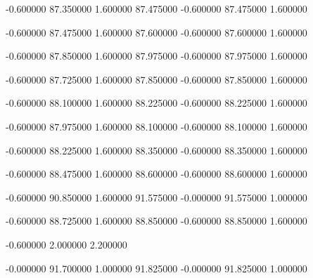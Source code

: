 {-0.600000} {87.350000} {1.600000} {87.475000} {-0.600000} {87.475000} {1.600000}

 {-0.600000} {87.475000} {1.600000} {87.600000} {-0.600000} {87.600000} {1.600000}

 {-0.600000} {87.850000} {1.600000} {87.975000} {-0.600000} {87.975000} {1.600000}

 {-0.600000} {87.725000} {1.600000} {87.850000} {-0.600000} {87.850000} {1.600000}

 {-0.600000} {88.100000} {1.600000} {88.225000} {-0.600000} {88.225000} {1.600000}

 {-0.600000} {87.975000} {1.600000} {88.100000} {-0.600000} {88.100000} {1.600000}

 {-0.600000} {88.225000} {1.600000} {88.350000} {-0.600000} {88.350000} {1.600000}

 {-0.600000} {88.475000} {1.600000} {88.600000} {-0.600000} {88.600000} {1.600000}

 {-0.600000} {90.850000} {1.600000} {91.575000} {-0.000000} {91.575000} {1.000000}

 {-0.600000} {88.725000} {1.600000} {88.850000} {-0.600000} {88.850000} {1.600000}

 {-0.600000} {2.000000} {2.200000}

 {-0.000000} {91.700000} {1.000000} {91.825000} {-0.000000} {91.825000} {1.000000}











